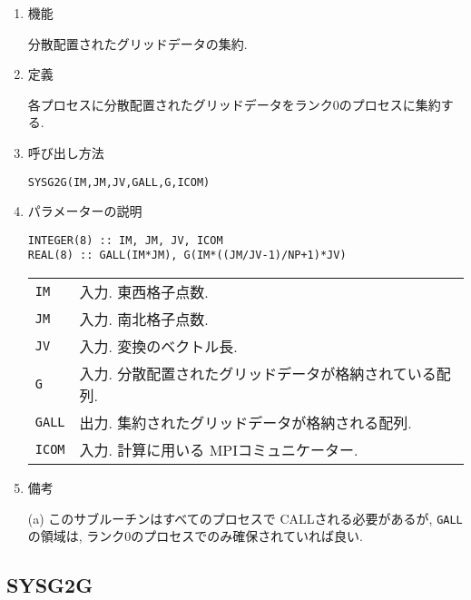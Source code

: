 \documentclass[a4j]{jsarticle}
\begin{document}
\begin{enumerate}

\item 機能 

分散配置されたグリッドデータの集約.

\item 定義

各プロセスに分散配置されたグリッドデータをランク0のプロセスに集約する.

\item 呼び出し方法 

\texttt{SYSG2G(IM,JM,JV,GALL,G,ICOM)}
  
\item パラメーターの説明

\begin{verbatim}        
INTEGER(8) :: IM, JM, JV, ICOM
REAL(8) :: GALL(IM*JM), G(IM*((JM/JV-1)/NP+1)*JV)
\end{verbatim}      

\begin{tabular}{ll}
\texttt{IM} & 入力. 東西格子点数.\\
\texttt{JM} & 入力. 南北格子点数.\\
\texttt{JV} & 入力. 変換のベクトル長.\\
\texttt{G} & 入力. 分散配置されたグリッドデータが格納されている配列.\\
\texttt{GALL} &  出力. 集約されたグリッドデータが格納される配列.\\
\texttt{ICOM} & 入力. 計算に用いる MPIコミュニケーター.
\end{tabular}

\item 備考

(a) このサブルーチンはすべてのプロセスで CALLされる必要があるが,
\texttt{GALL}の領域は, ランク0のプロセスでのみ確保されていれば良い.

\end{enumerate}



\subsection{SYSG2G}
\end{document}
